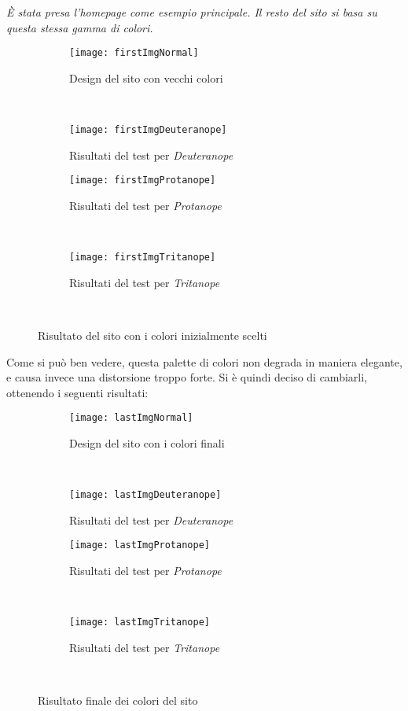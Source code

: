 \textit{\`E stata presa l'homepage come esempio principale. Il resto del sito si basa su questa stessa gamma di colori.}

\begin{figure}[H]
    \centering
    \begin{subfigure}[b]{0.45\textwidth}
        \texttt{[image: firstImgNormal]}
        \caption{Design del sito con vecchi colori}
    \end{subfigure}
    ~
    \begin{subfigure}[b]{0.45\textwidth}
        \texttt{[image: firstImgDeuteranope]}
        \caption{Risultati del test per \textit{Deuteranope}}
    \end{subfigure}
    \newline
    \begin{subfigure}[b]{0.45\textwidth}
        \texttt{[image: firstImgProtanope]}
        \caption{Risultati del test per \textit{Protanope}}
    \end{subfigure}
    ~
    \begin{subfigure}[b]{0.45\textwidth}
        \texttt{[image: firstImgTritanope]}
        \caption{Risultati del test per \textit{Tritanope}}
    \end{subfigure}
    ~
    \caption{Risultato del sito con i colori inizialmente scelti}
\end{figure}


Come si può ben vedere, questa palette di colori non degrada in maniera elegante, e causa invece una distorsione troppo forte. Si è quindi deciso di cambiarli, ottenendo i seguenti risultati:

\begin{figure}[H]
    \centering
    \begin{subfigure}[b]{0.45\textwidth}
        \texttt{[image: lastImgNormal]}
        \caption{Design del sito con i colori finali}
    \end{subfigure}
    ~
    \begin{subfigure}[b]{0.45\textwidth}
        \texttt{[image: lastImgDeuteranope]}
        \caption{Risultati del test per \textit{Deuteranope}}
    \end{subfigure}
    \newline
    \begin{subfigure}[b]{0.45\textwidth}
        \texttt{[image: lastImgProtanope]}
        \caption{Risultati del test per \textit{Protanope}}
    \end{subfigure}
    ~
    \begin{subfigure}[b]{0.45\textwidth}
        \texttt{[image: lastImgTritanope]}
        \caption{Risultati del test per \textit{Tritanope}}
    \end{subfigure}
    ~
    \caption{Risultato finale dei colori del sito}
\end{figure}



